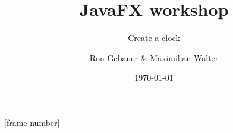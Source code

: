 \makeatletter
\makeatother

\usepackage[ngerman]{babel}
\usepackage[utf8]{inputenc}
\usepackage{amsmath,amsfonts,amssymb}

\usepackage{graphicx}
\usepackage{hyperref}

\usepackage{pgfpages}
\usepackage{handoutWithNotes}




[frame number]
\makeatletter
\makeatother


\title[JavaFX]{JavaFX workshop}
\subtitle[Clock]{Create a clock}

\author[RG \& MW]{Ron Gebauer \& Maximilian Walter}

\date[\today]{\today}



\subject{Clock created in JavaFX FXML Application}
